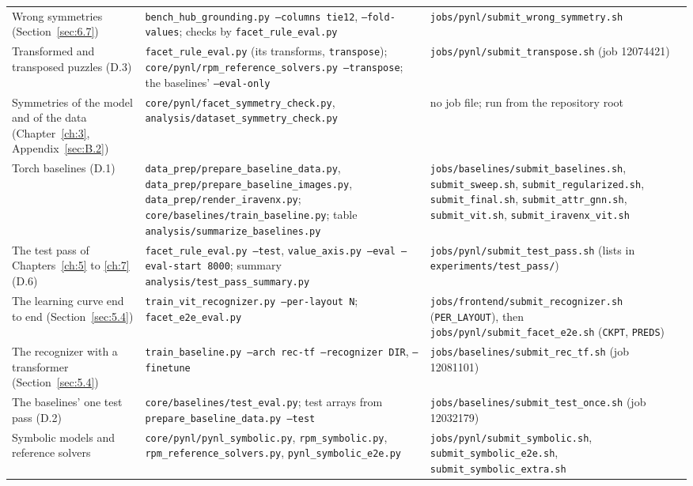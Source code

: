 {\begin{xltabular}{\linewidth}{@{}YYY@{}}
Wrong symmetries (Section~\ref{sec:6.7}) & \texttt{bench\_hub\_grounding.py --columns tie12}, \texttt{--fold-values}; checks by \texttt{facet\_rule\_eval.py} & \texttt{jobs/pynl/submit\_wrong\_symmetry.sh} \\
Transformed and transposed puzzles (D.3) & \texttt{facet\_rule\_eval.py} (its transforms, \texttt{transpose}); \texttt{core/pynl/rpm\_reference\_solvers.py --transpose}; the baselines' \texttt{--eval-only} & \texttt{jobs/pynl/submit\_transpose.sh} (job 12074421) \\
Symmetries of the model and of the data (Chapter~\ref{ch:3}, Appendix~\ref{sec:B.2}) & \texttt{core/pynl/facet\_symmetry\_check.py}, \texttt{analysis/dataset\_symmetry\_check.py} & no job file; run from the repository root \\
Torch baselines (D.1) & \texttt{data\_prep/prepare\_baseline\_data.py}, \texttt{data\_prep/prepare\_baseline\_images.py}, \texttt{data\_prep/render\_iravenx.py}; \texttt{core/baselines/train\_baseline.py}; table \texttt{analysis/summarize\_baselines.py} & \texttt{jobs/baselines/submit\_baselines.sh}, \texttt{submit\_sweep.sh}, \texttt{submit\_regularized.sh}, \texttt{submit\_final.sh}, \texttt{submit\_attr\_gnn.sh}, \texttt{submit\_vit.sh}, \texttt{submit\_iravenx\_vit.sh} \\
The test pass of Chapters~\ref{ch:5} to \ref{ch:7} (D.6) & \texttt{facet\_rule\_eval.py --test}, \texttt{value\_axis.py --eval --eval-start 8000}; summary \texttt{analysis/test\_pass\_summary.py} & \texttt{jobs/pynl/submit\_test\_pass.sh} (lists in \texttt{experiments/test\_pass/}) \\
The learning curve end to end (Section~\ref{sec:5.4}) & \texttt{train\_vit\_recognizer.py --per-layout N}; \texttt{facet\_e2e\_eval.py} & \texttt{jobs/frontend/submit\_recognizer.sh} (\texttt{PER\_LAYOUT}), then \texttt{jobs/pynl/submit\_facet\_e2e.sh} (\texttt{CKPT}, \texttt{PREDS}) \\
The recognizer with a transformer (Section~\ref{sec:5.4}) & \texttt{train\_baseline.py --arch rec-tf --recognizer DIR}, \texttt{--finetune} & \texttt{jobs/baselines/submit\_rec\_tf.sh} (job 12081101) \\
The baselines' one test pass (D.2) & \texttt{core/baselines/test\_eval.py}; test arrays from \texttt{prepare\_baseline\_data.py --test} & \texttt{jobs/baselines/submit\_test\_once.sh} (job 12032179) \\
Symbolic models and reference solvers & \texttt{core/pynl/pynl\_symbolic.py}, \texttt{rpm\_symbolic.py}, \texttt{rpm\_reference\_solvers.py}, \texttt{pynl\_symbolic\_e2e.py} & \texttt{jobs/pynl/submit\_symbolic.sh}, \texttt{submit\_symbolic\_e2e.sh}, \texttt{submit\_symbolic\_extra.sh} \\

\end{xltabular}}
